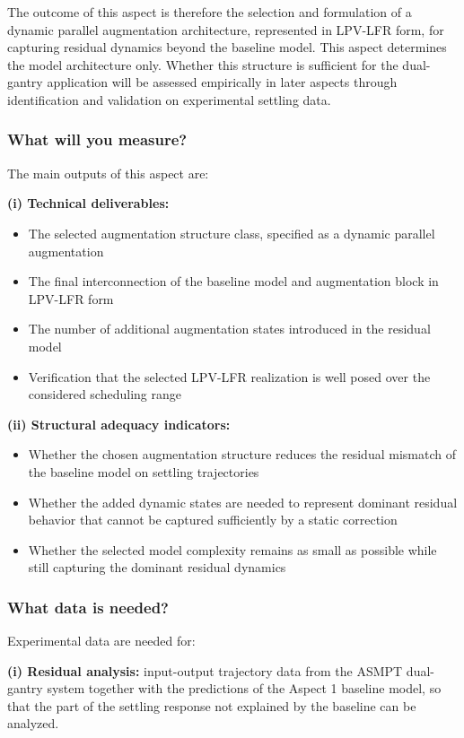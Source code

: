 The outcome of this aspect is therefore the selection and formulation of a dynamic parallel augmentation architecture, represented in LPV-LFR form, for capturing residual dynamics beyond the baseline model. This aspect determines the model architecture only. Whether this structure is sufficient for the dual-gantry application will be assessed empirically in later aspects through identification and validation on experimental settling data.

\subsubsection{What will you measure?}

The main outputs of this aspect are:

\textbf{(i) Technical deliverables:}
\begin{itemize}
    \item The selected augmentation structure class, specified as a dynamic parallel augmentation
    \item The final interconnection of the baseline model and augmentation block in LPV-LFR form
    \item The number of additional augmentation states introduced in the residual model
    \item Verification that the selected LPV-LFR realization is well posed over the considered scheduling range
\end{itemize}

\textbf{(ii) Structural adequacy indicators:}
\begin{itemize}
    \item Whether the chosen augmentation structure reduces the residual mismatch of the baseline model on settling trajectories
    \item Whether the added dynamic states are needed to represent dominant residual behavior that cannot be captured sufficiently by a static correction
    \item Whether the selected model complexity remains as small as possible while still capturing the dominant residual dynamics
\end{itemize}

\subsubsection{What data is needed?}

Experimental data are needed for:

\textbf{(i) Residual analysis:} input-output trajectory data from the ASMPT dual-gantry system together with the predictions of the Aspect 1 baseline model, so that the part of the settling response not explained by the baseline can be analyzed.

